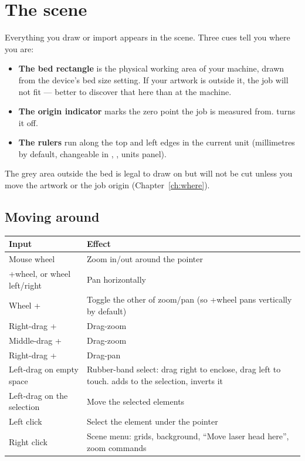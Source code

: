 \section{The scene}

Everything you draw or import appears in the scene. Three cues tell you where you
are:

\begin{itemize}
  \item \textbf{The bed rectangle} is the physical working area of your machine,
        drawn from the device's bed size setting. If your artwork is outside it,
        the job will not fit --- better to discover that here than at the machine.
  \item \textbf{The origin indicator} marks the zero point the job is measured
        from.  turns it off.
  \item \textbf{The rulers} run along the top and left edges in the current unit
        (millimetres by default, changeable in
        , , units panel).
\end{itemize}

\noindent The grey area outside the bed is legal to draw on but will not be cut
unless you move the artwork or the job origin (Chapter~\ref{ch:where}).

\subsection*{Moving around}

\begin{center}\small
\begin{tabular}{@{}L{4.4cm}L{9.8cm}@{}}
\toprule
\textbf{Input} & \textbf{Effect} \\
\midrule
Mouse wheel & Zoom in/out around the pointer \\
+wheel, or wheel left/right & Pan horizontally \\
Wheel +  & Toggle the other of zoom/pan (so +wheel pans
vertically by default) \\
Right-drag +  & Drag-zoom \\
Middle-drag +  & Drag-zoom \\
Right-drag +  & Drag-pan \\
Left-drag on empty space & Rubber-band select: drag right to enclose, drag left
to touch.  adds to the selection,  inverts it \\
Left-drag on the selection & Move the selected elements \\
Left click & Select the element under the pointer \\
Right click & Scene menu: grids, background, ``Move laser head here'', zoom
commands \\
\bottomrule
\end{tabular}
\end{center}

